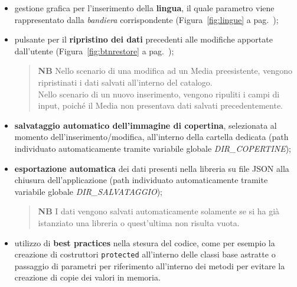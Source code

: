\documentclass[a4paper,10pt]{article}
\begin{document}
\begin{itemize}
		\item gestione grafica per l'inserimento della \textbf{lingua}, il quale parametro viene rappresentato dalla \textit{bandiera} corrispondente (Figura~\ref{fig:lingue} a pag.~\pageref{fig:lingue});
		\item pulsante per il \textbf{ripristino dei dati} precedenti alle modifiche apportate dall'utente (Figura~\ref{fig:btnrestore} a pag.~\pageref{fig:btnrestore});
		\begin{quote}
			\textbf{NB} Nello scenario di una modifica ad un Media preesistente, vengono ripristinati i dati salvati all'interno del catalogo.\\
			Nello scenario di un nuovo inserimento, vengono ripuliti i campi di input, poiché il Media non presentava dati salvati precedentemente.
		\end{quote}
		\item \textbf{salvataggio automatico dell'immagine di copertina}, selezionata al momento dell'inserimento/modifica, all'interno della cartella dedicata (path individuato automaticamente tramite variabile globale \textit{DIR\_COPERTINE});
		\item \textbf{esportazione automatica} dei dati presenti nella libreria su file JSON alla chiusura dell'applicazione (path individuato automaticamente tramite variabile globale \textit{DIR\_SALVATAGGIO});
		\begin{quote}
			\textbf{NB} I dati vengono salvati automaticamente solamente se si ha già istanziato una libreria o quest'ultima non risulta vuota.
		\end{quote}
		\item utilizzo di \textbf{best practices} nella stesura del codice, come per esempio la creazione di costruttori \texttt{protected} all'interno delle classi base astratte o passaggio di parametri per riferimento all'interno dei metodi per evitare la creazione di copie dei valori in memoria.
	\end{itemize}
\end{document}
